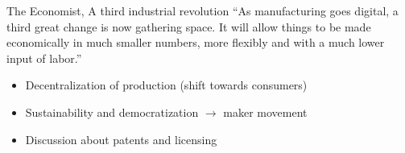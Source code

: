 \begin{frame}
    \begin{block}{The Economist, A third industrial revolution}
        ``As manufacturing goes digital, a third great change is now gathering space.
        It will allow things to be made economically in much smaller numbers, more flexibly and with a much lower input of labor.''
    \end{block}
    \begin{itemize}
        \item Decentralization of production (shift towards consumers)
        \item Sustainability and democratization $\rightarrow$ maker movement
        \item Discussion about patents and licensing
    \end{itemize}
\end{frame}